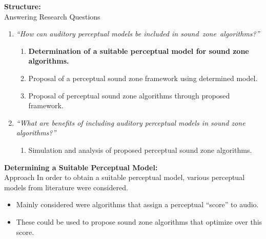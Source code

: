 \documentclass[aspectratio=169]{beamer}
\begin{document}
\begin{frame}{\textbf{Structure:}\\ Answering Research Questions}
    \begin{enumerate}
        \item {\textit{``How can auditory perceptual models be included in sound~zone~algorithms?''}}
            \vspace{7pt}
            \begin{enumerate}
                \item \textbf{Determination of a suitable perceptual model for sound zone algorithms.}
                \vspace{7pt}
                \item Proposal of a perceptual sound zone framework using determined model. 
                \vspace{7pt}
                \item Proposal of perceptual sound zone algorithms through proposed framework.
                \vspace{7pt}
            \end{enumerate}
        \item {\textit{``What are benefits of including auditory perceptual models in sound zone algorithms?''}}
            \vspace{-5pt}
            \begin{enumerate}
                \item Simulation and analysis of proposed perceptual sound zone algorithms.
            \end{enumerate}
    \end{enumerate}
\end{frame}

\begin{frame}{\textbf{Determining a Suitable Perceptual Model:}\\ Approach}
    In order to obtain a suitable perceptual model, various perceptual models from literature 
    were considered.\\
    \vspace{10pt}
    \begin{itemize}
        \item Mainly considered were algorithms that assign a perceptual ``score'' to audio.
        \item These could be used to propose sound zone algorithms that optimize over this score.
    \end{itemize}
\end{frame}
\end{document}
